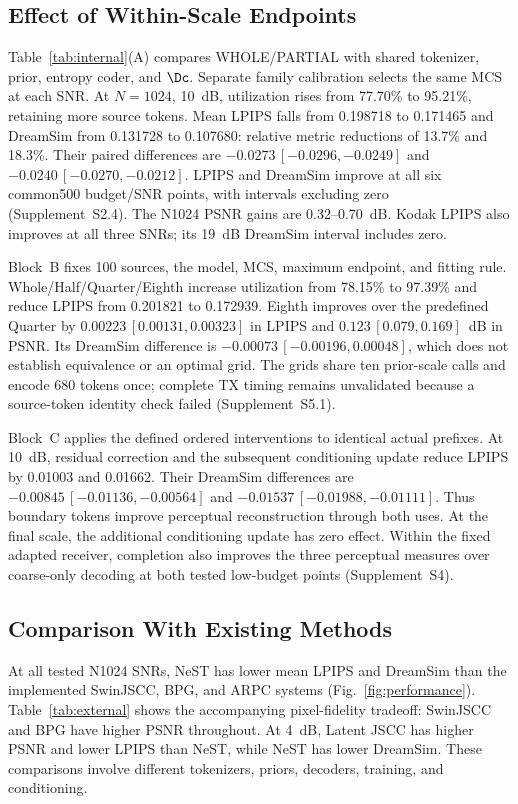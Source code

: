 \subsection{Effect of Within-Scale Endpoints}

Table~\ref{tab:internal}(A) compares WHOLE/PARTIAL with shared tokenizer, prior, entropy coder, and $\Dc$. Separate family calibration selects the same MCS at each SNR. At $N=1024$, 10~dB, utilization rises from 77.70\% to 95.21\%, retaining more source tokens. Mean LPIPS falls from 0.198718 to 0.171465 and DreamSim from 0.131728 to 0.107680: relative metric reductions of 13.7\% and 18.3\%. Their paired differences are $-0.0273\,[-0.0296,-0.0249]$ and $-0.0240\,[-0.0270,-0.0212]$. LPIPS and DreamSim improve at all six common500 budget/SNR points, with intervals excluding zero (Supplement~S2.4). The N1024 PSNR gains are 0.32--0.70~dB. Kodak LPIPS also improves at all three SNRs; its 19~dB DreamSim interval includes zero.

Block~B fixes 100 sources, the model, MCS, maximum endpoint, and fitting rule. Whole/Half/Quarter/Eighth increase utilization from 78.15\% to 97.39\% and reduce LPIPS from 0.201821 to 0.172939. Eighth improves over the predefined Quarter by $0.00223\,[0.00131,0.00323]$ in LPIPS and $0.123\,[0.079,0.169]$~dB in PSNR. Its DreamSim difference is $-0.00073\,[-0.00196,0.00048]$, which does not establish equivalence or an optimal grid. The grids share ten prior-scale calls and encode 680 tokens once; complete TX timing remains unvalidated because a source-token identity check failed (Supplement~S5.1).

Block~C applies the defined ordered interventions to identical actual prefixes. At 10~dB, residual correction and the subsequent conditioning update reduce LPIPS by 0.01003 and 0.01662. Their DreamSim differences are $-0.00845\,[-0.01136,-0.00564]$ and $-0.01537\,[-0.01988,-0.01111]$. Thus boundary tokens improve perceptual reconstruction through both uses. At the final scale, the additional conditioning update has zero effect. Within the fixed adapted receiver, completion also improves the three perceptual measures over coarse-only decoding at both tested low-budget points (Supplement~S4).

\subsection{Comparison With Existing Methods}
\ifCLASSOPTIONonecolumn\fi

At all tested N1024 SNRs, NeST has lower mean LPIPS and DreamSim than the implemented SwinJSCC, BPG, and ARPC systems (Fig.~\ref{fig:performance}). Table~\ref{tab:external} shows the accompanying pixel-fidelity tradeoff: SwinJSCC and BPG have higher PSNR throughout. At 4~dB, Latent JSCC has higher PSNR and lower LPIPS than NeST, while NeST has lower DreamSim. These comparisons involve different tokenizers, priors, decoders, training, and conditioning.

